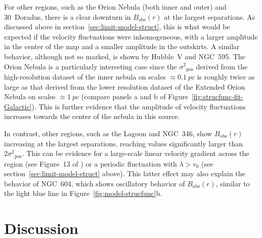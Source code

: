 \documentclass[fleqn,usenatbib, useAMS, a4paper]{mnras}
\newcommand\pos{\ensuremath{_{\mathrm{pos}}}}
\newcommand\obs{\ensuremath{_{\mathrm{obs}}}}
\begin{document}
For other regions,
such as the Orion Nebula (both inner and outer) and 30~Doradus,
there is a clear downturn in \(B\obs(r)\) at the largest separations.
As discussed above in section~\ref{sec:limit-model-struct},
this is what would be expected if the velocity fluctuations
were inhomogeneous, with a larger amplitude in the center of the map
and a smaller amplitude in the outskirts.
A similar behavior, although not so marked, is shown by
Hubble~V and NGC~595.
The Orion Nebula is a particularly interesting case
since the \(\sigma^2\pos\) derived from the high-resolution dataset of the inner nebula on scales \(\approx \SI{0.1}{pc}\)
is roughly twice as large as that derived from the lower resolution
dataset of the Extended Orion Nebula on scales \(\approx \SI{1}{pc}\)
(compare panels a and b of Figure~\ref{fig:strucfunc-fit-Galactic}).
This is further evidence that the amplitude of velocity fluctuations
increases towards the center of the nebula in this source.

In contrast, other regions,
such as the Lagoon and NGC~346,
show \(B\obs(r)\) increasing at the largest separations,
reaching values significantly larger than \(2\sigma^2\pos\).
This can be evidence for a large-scale linear velocity gradient
across the region (see Figure~13 of \citealp{arthur2016turbulence})
or a periodic fluctuation with \(\lambda > r_0\)
(see section~\ref{sec:limit-model-struct} above).
This latter effect may also explain the behavior of NGC~604,
which shows oscillatory behavior of \(B\obs(r)\),
similar to the light blue line in Figure~\ref{fig:model-strucfunc}b.





\section{Discussion}\label{sec:discussion}
\end{document}
